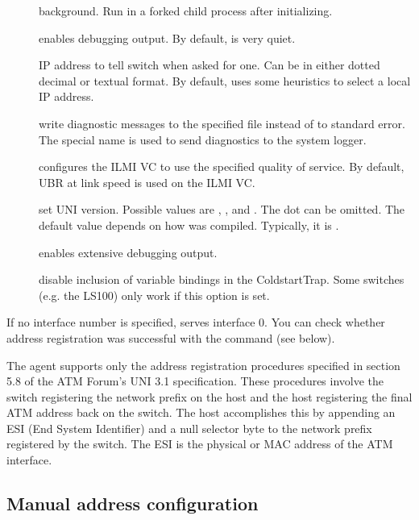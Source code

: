 \begin{description}
  \item[] background. Run in a forked child process after initializing.
  \item[] enables debugging output. By default,  is very
    quiet.
  \item[] IP address to tell switch when asked for one.
    Can be in either dotted decimal or textual format. By default, 
    uses some heuristics to select a local IP address.
  \item[] write diagnostic messages to the specified
    file instead of to standard error. The special name  is
    used to send diagnostics to the system logger.
  \item[] configures the ILMI VC to use the specified
    quality of service. By default, UBR at link speed is used on the ILMI VC.
  \item[] set UNI version. Possible values are
    , , and . The dot can be omitted. The default
    value depends on how  was compiled. Typically, it is .
  \item[] enables extensive debugging output.
  \item[] disable inclusion of variable bindings in the
    ColdstartTrap. Some switches (e.g. the LS100) only work if this option
    is set.
\end{description}

If no interface number is specified,  serves interface 0.
You can check whether address registration was successful with the
 command (see below).

The agent supports only the address registration procedures specified
in section 5.8 of the ATM Forum's UNI 3.1 specification.  These
procedures involve the switch registering the network prefix on the
host and the host registering the final ATM address back on the
switch.  The host accomplishes this by appending an ESI (End System
Identifier) and a null selector byte to the network prefix registered
by the switch.  The ESI is the physical or MAC address of the ATM
interface.


\subsection{Manual address configuration}
\label{atmaddr}

